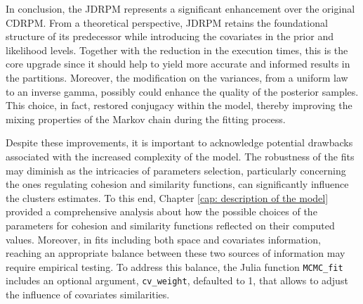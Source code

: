 \documentclass[12pt,	%
	a4paper,		%
	twoside,		%
	openright,		%
	titlepage,%
	]{book}
\theoremstyle{definition}
\newcommand{\mjline}[1]{\texttt{#1}}
\begin{document}
In conclusion, the JDRPM represents a significant enhancement over the original CDRPM. From a theoretical perspective, JDRPM retains the foundational structure of its predecessor while introducing the covariates in the prior and likelihood levels. Together with the reduction in the execution times, this is the core upgrade since it should help to yield more accurate and informed results in the partitions. Moreover, the modification on the variances, from a uniform law to an inverse gamma, possibly could enhance the quality of the posterior samples. This choice, in fact, restored conjugacy within the model, thereby improving the mixing properties of the Markov chain during the fitting process. 




Despite these improvements, it is important to acknowledge potential drawbacks associated with the increased complexity of the model. The robustness of the fits may diminish as the intricacies of parameters selection, particularly concerning the ones regulating cohesion and similarity functions, can significantly influence the clusters estimates. To this end, Chapter \ref{cap: description of the model} provided a comprehensive analysis about how the possible choices of the parameters for cohesion and similarity functions reflected on their computed values. Moreover, in fits including both space and covariates information, reaching an appropriate balance between these two sources of information may require empirical testing. To address this balance, the Julia function \mjline{MCMC_fit} includes an optional argument, \mjline{cv_weight}, defaulted to 1, that allows to adjust the influence of covariates similarities.
\end{document}
